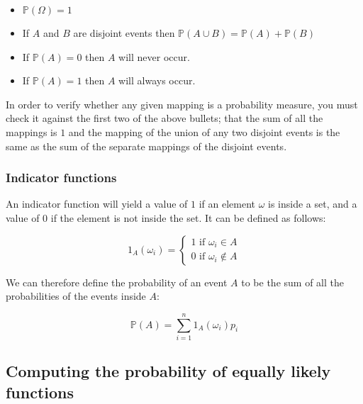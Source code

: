 \begin{itemize}
	\item $\mathbb{P}(\Omega) = 1$
	\item If $A$ and $B$ are disjoint events then $\mathbb{P}(A \cup B) = \mathbb{P}(A) + \mathbb{P}(B)$
	\item If $\mathbb{P}(A) = 0$ then $A$ will never occur.
	\item If $\mathbb{P}(A) = 1$ then $A$ will always occur.
\end{itemize}


In order to verify whether any given mapping is a probability measure, you must
check it against the first two of the above bullets; that the sum of all the
mappings is $1$ and the mapping of the union of any two disjoint events is the
same as the sum of the separate mappings of the disjoint events.

\subsubsection{Indicator functions}

An indicator function will yield a value of $1$ if an element $\omega$ is inside
a set, and a value of $0$ if the element is not inside the set. It can be
defined as follows:

\begin{dmath*}
	1_A(\omega_i) = \begin{cases} 
						1\textrm{ if }\omega_i \in A\\
						0\textrm{ if }\omega_i \not\in A
					\end{cases}
\end{dmath*}

We can therefore define the probability of an event $A$ to be the sum of all the
probabilities of the events inside $A$:

\begin{dmath*}
	\mathbb{P}(A) = \sum\limits_{i=1}^n1_A(\omega_i)p_i
\end{dmath*}


\subsection{Computing the probability of equally likely functions}

